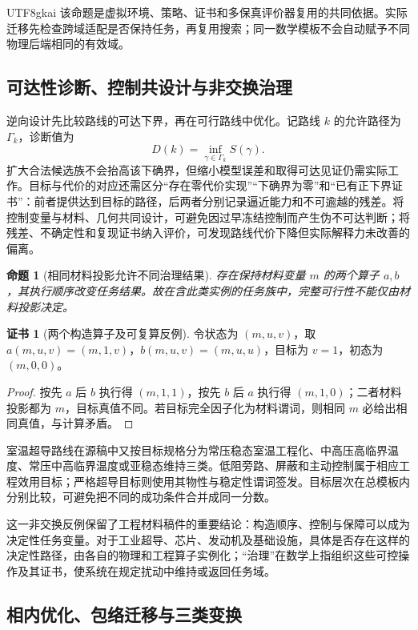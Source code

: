 \documentclass[11pt,a4paper]{article}
\theoremstyle{plain}
\newtheorem{proposition}[theorem]{命题}
\theoremstyle{definition}
\newtheorem*{certificate}{证书}
\theoremstyle{remark}
\begin{document}
\begin{CJK*}{UTF8}{gkai}
该命题是虚拟环境、策略、证书和多保真评价器复用的共同依据。实际迁移先检查跨域适配是否保持任务，再复用搜索；同一数学模板不会自动赋予不同物理后端相同的有效域。

\subsection{可达性诊断、控制共设计与非交换治理}

逆向设计先比较路线的可达下界，再在可行路线中优化。记路线 $k$ 的允许路径为 $\Gamma_k$，诊断值为
\[
 D(k)=\inf_{\gamma\in\Gamma_k}S(\gamma).
\]
扩大合法候选族不会抬高该下确界，但缩小模型误差和取得可达见证仍需实际工作。目标与代价的对应还需区分“存在零代价实现”“下确界为零”和“已有正下界证书”：前者提供达到目标的路径，后两者分别记录逼近能力和不可逾越的残差。将控制变量与材料、几何共同设计，可避免因过早冻结控制而产生伪不可达判断；将残差、不确定性和复现证书纳入评价，可发现路线代价下降但实际解释力未改善的偏离。\cite{S13}

\begin{proposition}[相同材料投影允许不同治理结果]
\label{fa:prop-material}
存在保持材料变量 $m$ 的两个算子 $a,b$，其执行顺序改变任务结果。故在含此类实例的任务族中，完整可行性不能仅由材料投影决定。
\end{proposition}
\begin{certificate}[两个构造算子及可复算反例]
令状态为 $(m,u,v)$，取 $a(m,u,v)=(m,1,v)$，$b(m,u,v)=(m,u,u)$，目标为 $v=1$，初态为 $(m,0,0)$。
\end{certificate}
\begin{proof}
按先 $a$ 后 $b$ 执行得 $(m,1,1)$，按先 $b$ 后 $a$ 执行得 $(m,1,0)$；二者材料投影都为 $m$，目标真值不同。若目标完全因子化为材料谓词，则相同 $m$ 必给出相同真值，与计算矛盾。
\end{proof}

室温超导路线在源稿中又按目标规格分为常压稳态室温工程化、中高压高临界温度、常压中高临界温度或亚稳态维持三类。低阻旁路、屏蔽和主动控制属于相应工程效用目标；严格超导目标则使用其物性与稳定性谓词签发。目标层次在总模板内分别比较，可避免把不同的成功条件合并成同一分数。

这一非交换反例保留了工程材料稿件的重要结论：构造顺序、控制与保障可以成为决定性任务变量。对于工业超导、芯片、发动机及基础设施，具体是否存在这样的决定性路径，由各自的物理和工程算子实例化；“治理”在数学上指组织这些可控操作及其证书，使系统在规定扰动中维持或返回任务域。

\subsection{相内优化、包络迁移与三类变换}


\end{CJK*}
\end{document}
